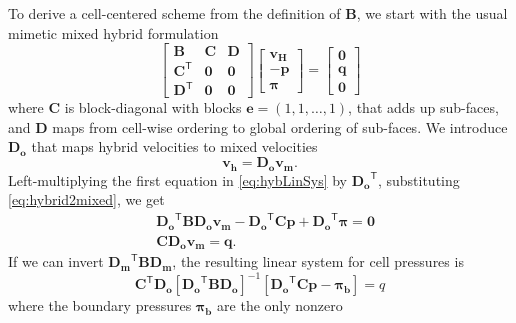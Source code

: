 \documentclass[11pt,fleqn]{amsart}
\newcommand{\vect}[1]{\boldsymbol{#1}}
\newcommand{\mat}[1]{\boldsymbol{#1}}
\newcommand{\transp}[1]{{#1}^{\ensuremath{\mathsf{T}}}}
\begin{document}
To derive a cell-centered scheme from the definition of $\mat{B}$, we
start with the usual mimetic mixed hybrid formulation
\begin{equation}
  \label{eq:hybLinSys}
   \begin{bmatrix}
     \mat{B} & \mat{C} & \mat{D}\\
     \transp{\mat{C}}  & \mat{0} & \mat{0}\\
     \transp{\mat{D}} &  \mat{0} & \mat{0}
   \end{bmatrix}
   \begin{bmatrix}
     \vect{v_H}\\ -\vect{p}\\ \vect{\pi}
   \end{bmatrix}
   =
   \begin{bmatrix}
     \vect{0} \\ \vect{q}\\ \vect{0}
   \end{bmatrix}
\end{equation}
where $\mat{C}$ is block-diagonal with blocks $\vect{e} = (1,1,\ldots,
1)$, that adds up sub-faces, and $\mat{D}$ maps from cell-wise
ordering to global ordering of sub-faces. We introduce $\mat{D_o}$
that maps hybrid velocities to mixed velocities
\begin{equation}
\label {eq:hybrid2mixed}
\vect{v_h} = \mat{D_o}\vect{v_m}.
\end{equation}
Left-multiplying the first equation in \eqref{eq:hybLinSys} by
$\transp{\mat{D_o}}$, substituting \eqref{eq:hybrid2mixed}, we get
\begin{align*}
  &\transp{\mat{D_o}}\mat{B}\mat{D_o}\vect{v_m} -
  \transp{\mat{D_o}}\mat{C}\vect{p} + 
  \transp {\mat{D_o}}\vect{\pi}=\vect{0}\\
  &\mat{C}\mat{D_o}\vect{v_m} = \vect{q}.
\end{align*}
If we can invert $\transp{\mat{D_m}}\mat{B}\mat{D_m}$, the resulting
linear system for cell pressures is 
\begin{equation}
  \transp{\mat{C}}\mat{D_o}[\transp{\mat{D_o}}\mat{B}\mat{D_o}]^{-1}
         [\transp{\mat{D_o}}\mat{C}\vect{p}-\vect{\pi_b}] = q
\end{equation}
where the boundary pressures $\vect{\pi_b}$ are the only nonzero
\end{document}
